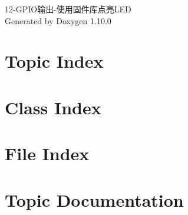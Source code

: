\documentclass[twoside]{book}
\newcommand{\+}{\discretionary{\mbox{\scriptsize$\hookleftarrow$}}{}{}}
\newcommand{\clearemptydoublepage}{%
    \newpage{\pagestyle{empty}\cleardoublepage}%
  }
\begin{document}
  \raggedbottom
    \hypersetup{pageanchor=false,
                bookmarksnumbered=true,
                pdfencoding=unicode
               }
  \begin{titlepage}
  \vspace*{7cm}
  \begin{center}%
  {\Large 12-\/\+GPIO输出-\/使用固件库点亮\+LED}\\
  \vspace*{1cm}
  {\large Generated by Doxygen 1.10.0}\\
  \end{center}
  \end{titlepage}
  \clearemptydoublepage
  \tableofcontents
  \clearemptydoublepage
  \hypersetup{pageanchor=true}

\chapter{Topic Index}

\chapter{Class Index}

\chapter{File Index}

\chapter{Topic Documentation}





\end{document}
